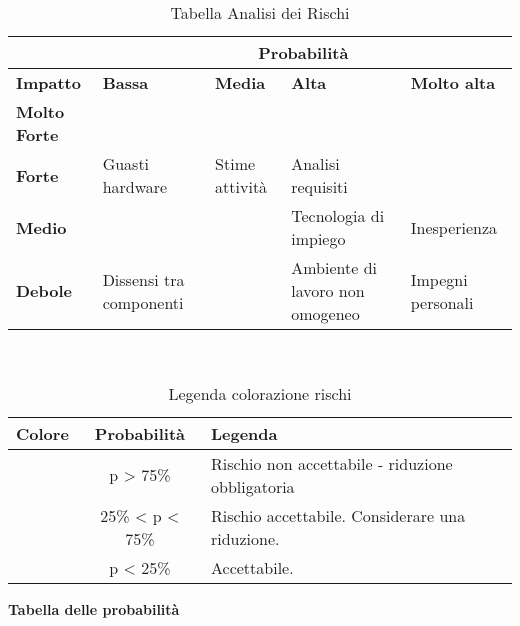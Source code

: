 \documentclass{scalatekids-article}
\begin{document}
\begin{table}[H]
  \centering
  \scriptsize
  \caption*{Tabella Analisi dei Rischi}
  \begin{tabular}{|m{1cm}|m{3cm}|m{3cm}|m{3cm}|m{3cm}|}
    \hline
    & \multicolumn{4}{|c|}{\textbf{Probabilità}}\\
    \hline
    \bf Impatto & \bf Bassa & \bf Media & \bf Alta & \textbf{Molto alta} \\
    \hline
    \bf Molto Forte & \cellcolor{red!50} & \cellcolor{red!50} & \cellcolor{red!50} &\cellcolor{red!50} \\
    \hline
    \bf Forte & \cellcolor{yellow!50}Guasti hardware & \cellcolor{yellow!50}Stime attività & \cellcolor{red!50}Analisi requisiti &\cellcolor{red!50}\\[8pt]
    \hline
    \bf Medio & \cellcolor{green!50} & \cellcolor{yellow!50} &\cellcolor{yellow!50}Tecnologia di impiego &\cellcolor{red!50}Inesperienza \\[8pt]
    \hline
    \bf Debole & \cellcolor{green!50}Dissensi tra componenti & \cellcolor{green!50} &\cellcolor{yellow!50}Ambiente di lavoro non omogeneo &\cellcolor{yellow!50}Impegni personali \\
    \hline
  \end{tabular} \\
\end{table}
\begin{table}[H]
  \centering
  \caption*{Legenda colorazione rischi}
  \begin{tabular}{|c|c|l|}
    \hline \bf Colore & \bf Probabilità & \bf Legenda \\
    \hline \cellcolor{red! 50} & p > 75\% & Rischio non accettabile - riduzione obbligatoria \\
    \hline \cellcolor{yellow! 50} & 25\% < p < 75\% & Rischio accettabile. Considerare una riduzione. \\
    \hline \cellcolor{green! 50} & p < 25\% & Accettabile. \\
    \hline
  \end{tabular}
\end{table}
\fi
\textbf{Tabella delle probabilità}
\end{document}
